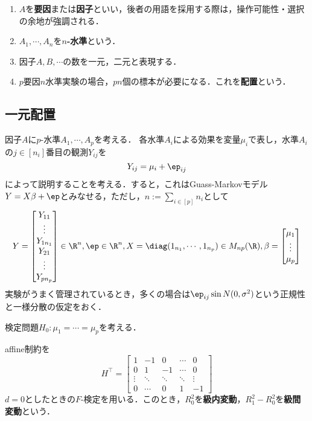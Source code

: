 \documentclass[uplatex,dvipdfmx]{jsreport}
\begin{document}
\begin{terms}\mbox{}
    \begin{enumerate}
        \item $A$を\textbf{要因}または\textbf{因子}といい，後者の用語を採用する際は，操作可能性・選択の余地が強調される．
        \item $A_1,\cdots,A_n$を\textbf{$n$-水準}という．
        \item 因子$A,B,\cdots$の数を一元，二元と表現する．
        \item $p$要因$n$水準実験の場合，$pn$個の標本が必要になる．これを\textbf{配置}という．
    \end{enumerate}
\end{terms}

\subsection{一元配置}

\begin{tcolorbox}[colframe=ForestGreen, colback=ForestGreen!10!white,breakable,colbacktitle=ForestGreen!40!white,coltitle=black,fonttitle=\bfseries\sffamily,
title=one-way ANOVA]
    
\end{tcolorbox}

\begin{model}
    因子$A$に$p$-水準$A_1,\cdots,A_p$を考える．
    各水準$A_i$による効果を変量$\mu_i$で表し，水準$A_i$の$j\in[n_i]$番目の観測$Y_{ij}$を
    \[Y_{ij}=\mu_i+\ep_{ij}\]
    によって説明することを考える．すると，これはGuass-Markovモデル$Y=X\beta+\ep$とみなせる，ただし，$n:=\sum_{i\in[p]}n_i$として
    \[Y=\begin{bmatrix}Y_{11}\\\vdots\\Y_{1n_1}\\Y_{21}\\\vdots\\Y_{pn_p}\end{bmatrix}\in\R^n,\ep\in\R^n,X=\diag(1_{n_1},\cdots,1_{n_p})\in M_{np}(\R),\beta=\begin{bmatrix}\mu_1\\\vdots\\\mu_p\end{bmatrix}\]
    実験がうまく管理されているとき，多くの場合は$\ep_{ij}\sin N(0,\sigma^2)$という正規性と一様分散の仮定をおく．
\end{model}

\begin{problem}
    検定問題$H_0:\mu_1=\cdots=\mu_p$を考える．
\end{problem}
\begin{test}
    affine制約を
    \[H^\top=\begin{bmatrix}1&-1&0&\cdots&0\\0&1&-1&\cdots&0\\\vdots&\ddots&\ddots&\ddots&\vdots\\0&\cdots&0&1&-1\end{bmatrix}\]
    $d=0$としたときの$F$-検定を用いる．このとき，$R^2_0$を\textbf{級内変動}，$R^2_1-R^2_0$を\textbf{級間変動}という．
\end{test}
\end{document}
